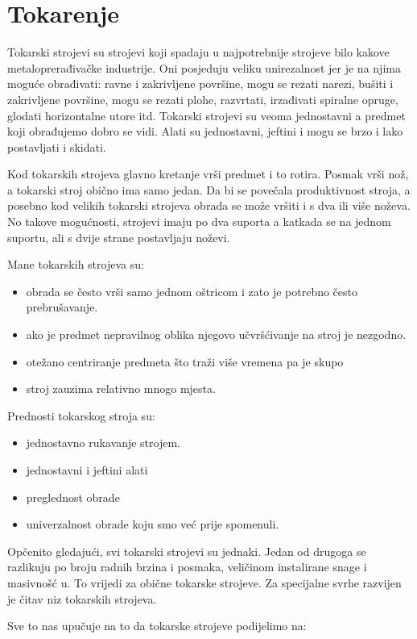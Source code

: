 \documentclass[a4paper,12pt]{article}
\numberwithin{figure}{section}
\begin{document}
\section{Tokarenje}
Tokarski strojevi su strojevi koji spadaju u najpotrebnije strojeve bilo kakove metaloprerađivačke industrije. Oni posjeduju veliku unirezalnost jer je na njima moguće obrađivati: ravne i zakrivljene površine, mogu se rezati narezi, bušiti i zakrivljene površine, mogu se rezati plohe, razvrtati, irzađivati spiralne opruge, glodati horizontalne utore itd. Tokarski strojevi su veoma jednostavni a predmet koji obrađujemo dobro se vidi. Alati su jednostavni, jeftini i mogu se brzo i lako postavljati i skidati.\par
Kod tokarskih strojeva glavno kretanje vrši predmet i to rotira. Posmak vrši nož, a tokarski stroj obično ima samo jedan. Da bi se povečala produktivnost stroja, a posebno kod velikih tokarski strojeva obrada se može vršiti i s dva ili više noževa. No takove mogućnosti, strojevi imaju po dva suporta a katkada se na jednom suportu, ali s dvije strane postavljaju noževi.\par 
Mane tokarskih strojeva su:
\begin{itemize}
\item obrada se često vrši samo jednom oštricom i zato je potrebno često prebrušavanje.
\item ako je predmet nepravilnog oblika njegovo učvršćivanje na stroj je nezgodno.
\item otežano centriranje predmeta što traži više vremena pa je skupo
\item stroj zauzima relativno mnogo mjesta.
\end{itemize}
Prednosti tokarskog stroja su:
\begin{itemize}
\item jednostavno rukavanje strojem.
\item jednostavni i jeftini alati
\item preglednost obrade
\item univerzalnost obrade koju smo već prije spomenuli.
\end{itemize}
Opčenito gledajući, svi tokarski strojevi su jednaki. Jedan od drugoga se razlikuju po broju radnih brzina i posmaka, veličinom instalirane snage i masivnošć u. To vrijedi za obične tokarske strojeve. Za specijalne svrhe razvijen je čitav niz tokarskih strojeva. \par
Sve to nas upučuje na to da tokarske strojeve podijelimo na:
\end{document}
